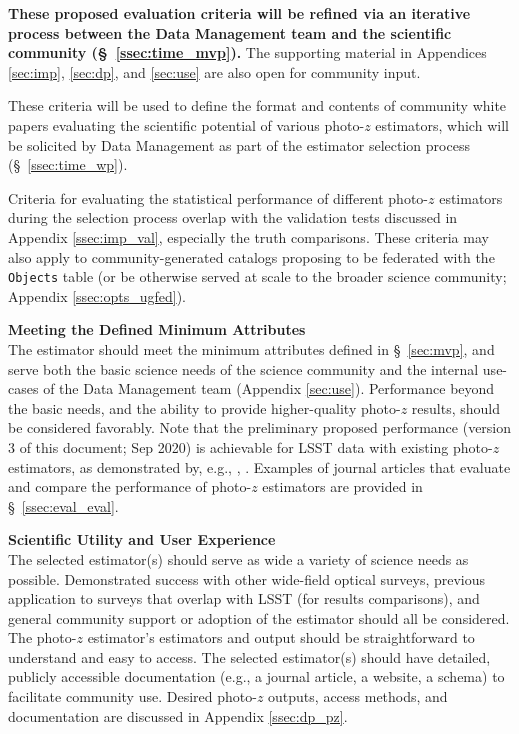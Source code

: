 \documentclass[DM,lsstdraft,toc]{lsstdoc}
\begin{document}
\textbf{These proposed evaluation criteria will be refined via an iterative process between the Data Management team and the scientific community (\S~\ref{ssec:time_mvp}).} The supporting material in Appendices \ref{sec:imp}, \ref{sec:dp}, and \ref{sec:use} are also open for community input.

These criteria will be used to define the format and contents of community white papers evaluating the scientific potential of various photo-$z$ estimators, which will be solicited by Data Management as part of the estimator selection process (\S~\ref{ssec:time_wp}).

Criteria for evaluating the statistical performance of different photo-$z$ estimators during the selection process overlap with the validation tests discussed in Appendix \ref{ssec:imp_val}, especially the truth comparisons.
These criteria may also apply to community-generated catalogs proposing to be federated with the {\tt Objects} table (or be otherwise served at scale to the broader science community; Appendix \ref{ssec:opts_ugfed}).

{\bf Meeting the Defined Minimum Attributes}\\
The estimator should meet the minimum attributes defined in \S~\ref{sec:mvp}, and serve both the basic science needs of the science community and the internal use-cases of the Data Management team (Appendix \ref{sec:use}).
Performance beyond the basic needs, and the ability to provide higher-quality photo-$z$ results, should be considered favorably.
Note that the preliminary proposed performance (version 3 of this document; Sep 2020) is achievable for LSST data with existing photo-$z$ estimators, as demonstrated by, e.g., \citet{2018AJ....155....1G}, \citet{2020arXiv200103621S}.
Examples of journal articles that evaluate and compare the performance of photo-$z$ estimators are provided in \S~\ref{ssec:eval_eval}.

{\bf Scientific Utility and User Experience}\\
The selected estimator(s) should serve as wide a variety of science needs as possible.
Demonstrated success with other wide-field optical surveys, previous application to surveys that overlap with LSST (for results comparisons), and general community support or adoption of the estimator should all be considered.
The photo-$z$ estimator's estimators and output should be straightforward to understand and easy to access.
The selected estimator(s) should have detailed, publicly accessible documentation (e.g., a journal article, a website, a schema) to facilitate community use.
Desired photo-$z$ outputs, access methods, and documentation are discussed in Appendix \ref{ssec:dp_pz}.
\end{document}
